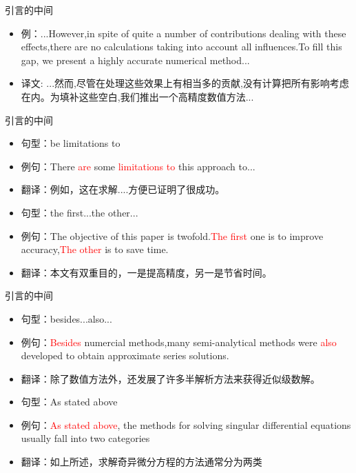 \documentclass[13pt]{ctexbeamer}
\newcommand{\red}[1]{\textcolor{red}{#1}}
\begin{document}
\begin{frame}{引言的中间}

\begin{itemize}
    \item
    例：...However,in spite of quite a number of contributions dealing with these effects,there are no calculations taking into account all influences.To fill this gap, we present a highly accurate numerical method...
    \item 译文: ...然而,尽管在处理这些效果上有相当多的贡献,没有计算把所有影响考虑在内。为填补这些空白,我们推出一个高精度数值方法...

\end{itemize}
\end{frame}

\begin{frame}{引言的中间}

\begin{itemize}
    \item 句型：be limitations to
    \item 例句：There \red{are} some \red{limitations to} this approach to...
    \item 翻译：例如，这在求解....方便已证明了很成功。
    \newline
    \item 句型：the first...the other...
    \item 例句：The objective of this paper is twofold.\red{The first} one is to improve accuracy,\red{The other} is to save time.
    \item 翻译：本文有双重目的，一是提高精度，另一是节省时间。

\end{itemize}
\end{frame}

\begin{frame}{引言的中间}

\begin{itemize}
    \item 句型：besides...also...
    \item 例句：\red{Besides} numercial methods,many semi-analytical methods were \red{also} developed to obtain approximate series solutions.
    \item 翻译：除了数值方法外，还发展了许多半解析方法来获得近似级数解。
    \newline
    \item 句型：As stated above
    \item 例句：\red{As stated above}, the methods for solving singular differential equations usually fall into two categories
    \item 翻译：如上所述，求解奇异微分方程的方法通常分为两类

\end{itemize}
\end{frame}
\end{document}
